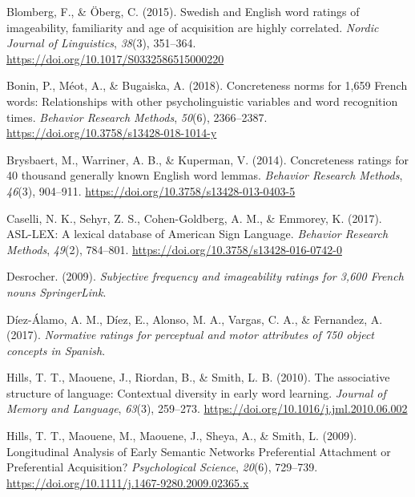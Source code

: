 \documentclass[
  man,floatsintext]{apa6}
\newlength{\cslhangindent}
\newlength{\cslentryspacingunit} %
\newenvironment{CSLReferences}[2] %
 {%
  \setlength{\parindent}{0pt}
  \ifodd #1
  \let\oldpar\par
  \def\par{\hangindent=\cslhangindent\oldpar}
  \fi
  \setlength{\parskip}{#2\cslentryspacingunit}
 }%
 {}
\begin{document}
\hypertarget{refs}{}
\begin{CSLReferences}{1}{0}
\leavevmode{}%
Blomberg, F., \& Öberg, C. (2015). Swedish and English word ratings of imageability, familiarity and age of acquisition are highly correlated. \emph{Nordic Journal of Linguistics}, \emph{38}(3), 351--364. \url{https://doi.org/10.1017/S0332586515000220}

\leavevmode{}%
Bonin, P., Méot, A., \& Bugaiska, A. (2018). Concreteness norms for 1,659 {French} words: {Relationships} with other psycholinguistic variables and word recognition times. \emph{Behavior Research Methods}, \emph{50}(6), 2366--2387. \url{https://doi.org/10.3758/s13428-018-1014-y}

\leavevmode{}%
Brysbaert, M., Warriner, A. B., \& Kuperman, V. (2014). Concreteness ratings for 40 thousand generally known {English} word lemmas. \emph{Behavior Research Methods}, \emph{46}(3), 904--911. \url{https://doi.org/10.3758/s13428-013-0403-5}

\leavevmode{}%
Caselli, N. K., Sehyr, Z. S., Cohen-Goldberg, A. M., \& Emmorey, K. (2017). {ASL-LEX}: {A} lexical database of {American Sign Language}. \emph{Behavior Research Methods}, \emph{49}(2), 784--801. \url{https://doi.org/10.3758/s13428-016-0742-0}

\leavevmode{}%
Desrocher. (2009). \emph{Subjective frequency and imageability ratings for 3,600 {French} nouns {\textbar} {SpringerLink}}.

\leavevmode{}%
Díez-Álamo, A. M., Díez, E., Alonso, M. A., Vargas, C. A., \& Fernandez, A. (2017). \emph{Normative ratings for perceptual and motor attributes of 750 object concepts in {Spanish}}.

\leavevmode{}%
Hills, T. T., Maouene, J., Riordan, B., \& Smith, L. B. (2010). The associative structure of language: {Contextual} diversity in early word learning. \emph{Journal of Memory and Language}, \emph{63}(3), 259--273. \url{https://doi.org/10.1016/j.jml.2010.06.002}

\leavevmode{}%
Hills, T. T., Maouene, M., Maouene, J., Sheya, A., \& Smith, L. (2009). Longitudinal {Analysis} of {Early Semantic Networks Preferential Attachment} or {Preferential Acquisition}? \emph{Psychological Science}, \emph{20}(6), 729--739. \url{https://doi.org/10.1111/j.1467-9280.2009.02365.x}


\end{CSLReferences}
\end{document}
